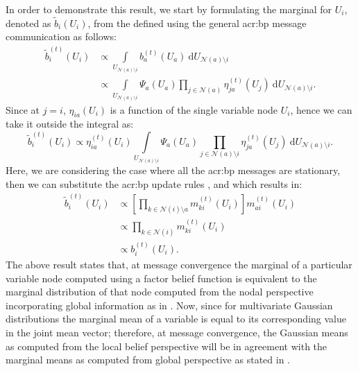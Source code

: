 In order to demonstrate this result, we start by formulating the marginal for $U_i$, denoted as $\tilde{b}_{i}(U_{i})$, from the defined  using the general \gls{acr:bp} message communication as follows:
\begin{align}
	\tilde{b}_{i}^{(t)}(U_{i})& \propto\underset{U_{\mathcal{N}(a)\setminus i}}{\int} b_{a}^{(t)}(U_{a})\ \mathrm{d}U_{\mathcal{N}(a)\setminus i}\\
	& \propto\underset{U_{\mathcal{N}(a)\setminus i}}{\int}\Psi_{a}(U_{a})\prod_{j\in\mathcal{N}(a)}\eta_{ja}^{(t)}(U_{j})\ \mathrm{d}U_{\mathcal{N}(a)\setminus i}.
\end{align}
Since at $j=i$, $\eta_{ia}(U_{i})$ is a function of the single variable node $U_i$, hence we can take it outside the integral as:
\begin{equation}
	\tilde{b}_{i}^{(t)}(U_{i}) \propto \eta_{ia}^{(t)}(U_{i})\underset{U_{\mathcal{N}(a)\setminus i}}{\int}\Psi_{a}(U_{a})\prod_{j\in\mathcal{N}(a)\setminus i}\eta_{ja}^{(t)}(U_{j})\ \mathrm{d}U_{\mathcal{N}(a)\setminus i}.
\end{equation}
Here, we are considering the case where all the \gls{acr:bp} messages are stationary, then we can substitute the \gls{acr:bp} update rules ,  and  which results in:
\begin{align}
	\tilde{b}_{i}^{(t)}(U_{i}) & \propto\left[\prod_{k\in\mathcal{N}(i)\setminus a}m_{ki}^{(t)}(U_{i})\right]m_{ai}^{(t)}(U_{i})\\
	& \propto\prod_{k\in\mathcal{N}(i)}m_{ki}^{(t)}(U_{i})\\
	& \propto b_{i}^{(t)}(U_{i}).
\end{align}
The above result states that, at message convergence the marginal of a particular variable node computed using a factor belief function is equivalent to the marginal distribution of that node computed from the nodal perspective incorporating global information as in .
Now, since for multivariate Gaussian distributions the marginal mean of a variable is equal to its corresponding value in the joint mean vector; therefore, at message convergence, the Gaussian means as computed from the local belief perspective will be in agreement with the marginal means as computed from global perspective as stated in .

